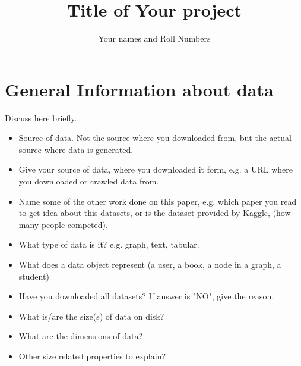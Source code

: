 \documentclass[11pt]{article}
\title{Title of Your project}
\author{Your names and Roll Numbers}
\begin{document}
\maketitle
		
\section{General Information about data}
Discuss here briefly. 
\begin{itemize}
	\item Source of data. Not the source where you downloaded from, but the actual source where data is generated. 
	\item Give your source of data, where you downloaded it form, e.g. a URL where you downloaded  or crawled data from.
	\item Name some of the other work done on this paper, e.g. which paper you read to get idea about this datasets, or is the dataset provided by Kaggle, (how many people competed).
	\item 	What type of data is it? e.g. graph, text, tabular.
	\item What does a data object represent (a user, a book, a node in a graph, a student)
	\item Have you downloaded all datasets? If answer is "NO", give the reason. 
	\item What is/are the size(s) of data on disk?
	\item What are the dimensions of data?
	\item Other size related properties to explain?
	
\end{itemize}
\end{document}
